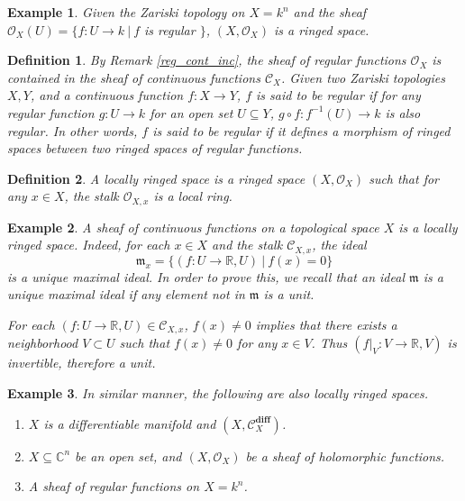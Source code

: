 \documentclass{article}
\newtheorem{definition}{Definition}[section]
\newtheorem{example}{Example}[section]
\numberwithin{equation}{section}
\begin{document}
\begin{example}
Given the Zariski topology on $X=k^n$ and the sheaf $\mathcal{O}_X(U) = \{f:U\to k\:|\: f$ is regular $\}$, $(X,\mathcal{O}_X)$ is a ringed space.
\end{example}

\begin{definition}
By Remark \ref{reg_cont_inc}, the sheaf of regular functions $\mathcal{O}_X$ is contained in the sheaf of continuous functions $\mathcal{C}_X$. Given two Zariski topologies $X,Y$, and a continuous function $f:X\to Y$, $f$ is said to be regular if 
for any regular function $g:U\to k$ for an open set $U\subseteq Y$, $g\circ f:f^{-1}(U)\to k$ is also regular. In other words, $f$ is said to be regular if it defines a morphism of ringed spaces between two ringed spaces of regular functions. 
\end{definition}

\begin{definition}
A locally ringed space is a ringed space $(X,\mathcal{O}_X)$ such that for any $x\in X$, the stalk $\mathcal{O}_{X,x}$ is a local ring.
\end{definition}

\begin{example}
A sheaf of continuous functions on a topological space $X$ is a locally ringed space. Indeed, for each $x\in X$ and the stalk $\mathcal{C}_{X,x}$, the ideal 
\begin{equation*}
\mathfrak{m}_x = \{(f:U\to\mathbb{R},U)\:|\: f(x)=0\}
\end{equation*}
is a unique maximal ideal. In order to prove this, we recall that an ideal $\mathfrak{m}$ is a unique maximal ideal if any element not in $\mathfrak{m}$ is a unit.\\
\par For each $(f:U\to\mathbb{R},U)\in\mathcal{C}_{X,x}$, $f(x)\not=0$ implies that there exists a neighborhood $V\subset U$ such that $f(x)\not=0$ for any $x\in V$. Thus $(f|_V:V\to\mathbb{R},V)$ is invertible, therefore a unit.
\end{example}

\begin{example}
In similar manner, the following are also locally ringed spaces.
\begin{enumerate}
\item $X$ is a differentiable manifold and $(X,\mathcal{C}^{\mathbf{diff}}_X)$.
\item $X\subseteq \mathbb{C}^n$ be an open set, and $(X,\mathcal{O}_X)$ be a sheaf of holomorphic functions.
\item A sheaf of regular functions on $X=k^n$. 
\end{enumerate}
\end{example}
\end{document}

